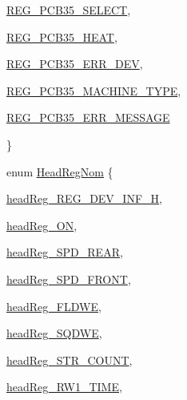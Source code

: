 \begin{DoxyCompactItemize}
\begin{DoxyCompactItemize}
\item\mbox{\hyperlink{classRegister_a6b7cab4f601efc139a6589f92bdd97eaa4689352e5c72e73bd82ad805bba68cc9}{R\+E\+G\+\_\+\+P\+C\+B35\+\_\+\+S\+E\+L\+E\+CT}}, 
\item\mbox{\hyperlink{classRegister_a6b7cab4f601efc139a6589f92bdd97eaaaf921ac7552ce7225d836fb3eef0fc52}{R\+E\+G\+\_\+\+P\+C\+B35\+\_\+\+H\+E\+AT}}, 
\item\mbox{\hyperlink{classRegister_a6b7cab4f601efc139a6589f92bdd97eaa20d5bc44a41734b1a75c0821c9f52ce3}{R\+E\+G\+\_\+\+P\+C\+B35\+\_\+\+E\+R\+R\+\_\+\+D\+EV}}, 
\item\mbox{\hyperlink{classRegister_a6b7cab4f601efc139a6589f92bdd97eaa9150e0fd27bb82046962db80bb841ecd}{R\+E\+G\+\_\+\+P\+C\+B35\+\_\+\+M\+A\+C\+H\+I\+N\+E\+\_\+\+T\+Y\+PE}}, 
\item\mbox{\hyperlink{classRegister_a6b7cab4f601efc139a6589f92bdd97eaa5bdf778fe409d7ffbd3683fd075ed5bf}{R\+E\+G\+\_\+\+P\+C\+B35\+\_\+\+E\+R\+R\+\_\+\+M\+E\+S\+S\+A\+GE}}
\end{DoxyCompactItemize} \}
\item 
enum \mbox{\hyperlink{classRegister_ac62b4973b5619eb86226477da8f02599}{Head\+Reg\+Nom}} \{ 
\begin{DoxyCompactItemize}
\item\mbox{\hyperlink{classRegister_ac62b4973b5619eb86226477da8f02599adb7d9244a5e7cc41099e248fdbffaf7a}{head\+Reg\+\_\+\+R\+E\+G\+\_\+\+D\+E\+V\+\_\+\+I\+N\+F\+\_\+H}}, 
\item\mbox{\hyperlink{classRegister_ac62b4973b5619eb86226477da8f02599a0117123ac77acd794a16cfe30f114fdf}{head\+Reg\+\_\+\+ON}}, 
\item\mbox{\hyperlink{classRegister_ac62b4973b5619eb86226477da8f02599a97bb43edf6823c81c3d1744b7da2a053}{head\+Reg\+\_\+\+S\+P\+D\+\_\+\+R\+E\+AR}}, 
\item\mbox{\hyperlink{classRegister_ac62b4973b5619eb86226477da8f02599a465aae98264c43d407c5e00452acc977}{head\+Reg\+\_\+\+S\+P\+D\+\_\+\+F\+R\+O\+NT}}, 
\item\mbox{\hyperlink{classRegister_ac62b4973b5619eb86226477da8f02599a157558bdc7f0d8e775dac4657f377360}{head\+Reg\+\_\+\+F\+L\+D\+WE}}, 
\item\mbox{\hyperlink{classRegister_ac62b4973b5619eb86226477da8f02599ae62186a73a9bc5b23f1b9dbdf5e168ec}{head\+Reg\+\_\+\+S\+Q\+D\+WE}}, 
\item\mbox{\hyperlink{classRegister_ac62b4973b5619eb86226477da8f02599aa32f9573697fce5881e1f5674818f370}{head\+Reg\+\_\+\+S\+T\+R\+\_\+\+C\+O\+U\+NT}}, 
\item\mbox{\hyperlink{classRegister_ac62b4973b5619eb86226477da8f02599a280ef5cfa32956b36f50e87c5e032e7e}{head\+Reg\+\_\+\+R\+W1\+\_\+\+T\+I\+ME}}, 

\end{DoxyCompactItemize}
\end{DoxyCompactItemize}
